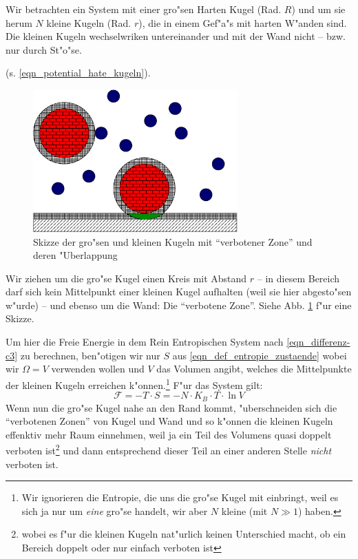 Wir betrachten ein System mit einer gro"sen Harten Kugel (Rad. $R$) und um sie
herum $N$ kleine Kugeln (Rad. $r$), die in einem Gef"a"s mit harten
W"anden sind. Die kleinen Kugeln wechselwriken untereinander und mit der
Wand nicht -- bzw. nur durch St"o"se. 

(s. \eqref{eqn_potential_hate_kugeln}).
\begin{figure}[h]
   \centering
   \includegraphics[width=0.7\textwidth]{bilder/kugeln}
   \caption[Gro"se und kleine Harte Kugeln]{Skizze der gro"sen und
     kleinen Kugeln mit "`verbotener Zone"' und deren "Uberlappung}
   \label{abb_skizze_kugeln}
\end{figure}


Wir ziehen um die gro"se Kugel einen Kreis mit Abstand $r$ -- in diesem
Bereich darf sich kein Mittelpunkt einer kleinen Kugel aufhalten (weil
sie hier abgesto"sen w"urde) -- und ebenso um die Wand: Die
"`verbotene Zone"'.  Siehe
Abb. \ref{abb_skizze_kugeln} f"ur eine Skizze.

Um hier die Freie Energie in dem Rein Entropischen System nach
\eqref{eqn_differenz-c3} zu berechnen, ben"otigen wir nur $S$ aus
\eqref{eqn_def_entropie_zustaende} wobei wir $\Omega = V$ verwenden
wollen und $V$ das Volumen angibt, welches die Mittelpunkte der
kleinen Kugeln erreichen k"onnen.\footnote{Wir ignorieren die Entropie,
  die uns die gro"se Kugel mit einbringt, weil es sich ja nur um
  \emph{eine} gro"se handelt, wir aber $N$ kleine (mit $N \gg 1$)
  haben.} F"ur das System gilt:
\begin{equation}
   \label{eqn_differenz-c4}
   \mathcal F = - T \cdot S = - N \cdot K_B \cdot T \cdot \ln V
\end{equation}
Wenn nun die gro"se Kugel nahe an den Rand kommt, "uberschneiden
sich die "`verbotenen Zonen"' von Kugel und Wand und so k"onnen die
kleinen Kugeln effenktiv mehr Raum einnehmen, weil ja ein Teil des
 Volumens quasi doppelt verboten ist\footnote{wobei es f"ur
  die kleinen Kugeln nat"urlich keinen Unterschied macht, ob ein
  Bereich doppelt oder nur einfach verboten ist} und dann entsprechend
dieser Teil an einer anderen Stelle \emph{nicht} verboten ist. 

